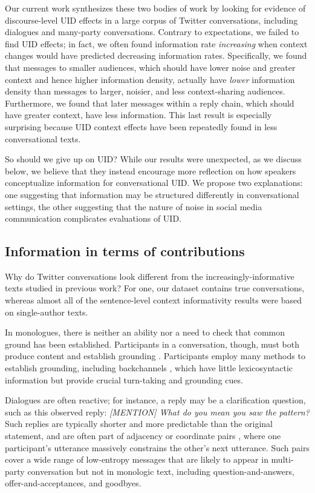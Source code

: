 \documentclass[11pt,letterpaper]{article}
\begin{document}
Our current work synthesizes these two bodies of work by looking for evidence of discourse-level UID effects in a large corpus of Twitter conversations, including dialogues and many-party conversations.  Contrary to expectations, we failed to find UID effects; in fact, we often found information rate \emph{increasing} when context changes would have predicted decreasing information rates.  Specifically, we found that messages to smaller audiences, which should have lower noise and greater context and hence higher information density, actually have \emph{lower} information density than messages to larger, noisier, and less context-sharing audiences. Furthermore, we found that later messages within a reply chain, which should have greater context, have less information.  This last result is especially surprising because UID context effects have been repeatedly found in less conversational texts.

So should we give up on UID? While our results were unexpected, as we discuss below, we believe that they instead encourage more reflection on how speakers conceptualize information for conversational UID. We propose two explanations: one suggesting that information may be structured differently in conversational settings, the other suggesting that the nature of noise in social media communication complicates evaluations of UID.

\subsection{Information in terms of contributions}

Why do Twitter conversations look different from the increasingly-informative texts studied in previous work? For one, our dataset contains true conversations, whereas almost all of the sentence-level context informativity results were based on single-author texts. 

In monologues, there is neither an ability nor a need to check that common ground has been established. Participants in a conversation, though, must both produce content and establish grounding \cite{clark1987}. Participants employ many methods to establish grounding, including backchannels \cite{yngve1970,schegloff1982,iwasaki1997}, which have little lexicosyntactic information but provide crucial turn-taking and grounding cues.

Dialogues are often reactive; for instance, a reply may be a clarification question, such as this observed reply: {\it [MENTION] What do you mean you saw the pattern?}  Such replies are typically shorter and more predictable than the original statement, and are often part of adjacency or coordinate pairs \cite{schegloff1973,clark1981}, where one participant's utterance massively constrains the other's next utterance. Such pairs cover a wide range of low-entropy messages that are likely to appear in multi-party conversation but not in monologic text, including question-and-answers, offer-and-acceptances, and goodbyes.
\end{document}
